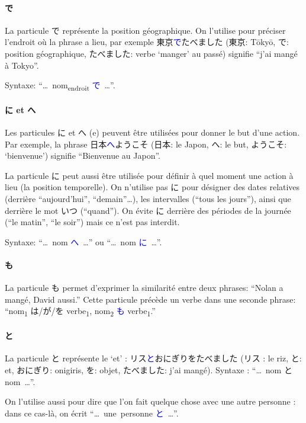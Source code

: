 \documentclass[a4paper,10pt,french,openany]{memoir}
\newcommand{\term}[1]{\textcolor{blue}{#1}}
\begin{document}
\paragraph{で}
La particule で représente la position géographique. On l'utilise pour préciser l'endroit où la phrase a lieu, par exemple 東京\term{で}たべました (東京: Tōkyō, で: position géographique, たべました: verbe `manger' au passé) signifie ``j'ai mangé à Tokyo''.

Syntaxe: ``…~nom\textsubscript{endroit} \term{で}~…''.

\paragraph{に et へ}
Les particules に et へ (e) peuvent être utilisées pour donner le but d'une action. Par exemple, la phrase 日本\term{へ}ようこそ (日本: le Japon, へ: le but, ようこそ: `bienvenue') signifie ``Bienvenue au Japon''.

La particule に peut aussi être utilisée pour définir à quel moment une action à lieu (la position temporelle). On n'utilise pas に pour désigner des dates relatives (derrière ``aujourd'hui'', ``demain''\dots), les intervalles (``tous les jours''), ainsi que derrière le mot いつ (``quand''). On évite に derrière des périodes de la journée (``le matin'', ``le soir'') mais ce n'est pas interdit.

Syntaxe: ``…~nom \term{へ}~…'' ou ``…~nom \term{に}~…''.

\paragraph{も}
La particule も permet d'exprimer la similarité entre deux phrases: ``Nolan a mangé, David aussi.''
Cette particule précède un verbe dans une seconde phrase: ``nom\textsubscript{1} は/が/を verbe\textsubscript{1}, nom\textsubscript{2} \term{も} verbe\textsubscript{1}.''

\paragraph{と}
La particule と représente le `et' : リス\term{と}おにぎりをたべました (リス : le riz, と: et, おにぎり: onigiris, を: objet, たべました: j'ai mangé). Syntaxe : ``…~nom と nom~…''.

On l'utilise aussi pour dire que l'on fait quelque chose avec une autre personne : dans ce cas-là, on écrit ``…~une~personne \term{と}~…''.
\end{document}
